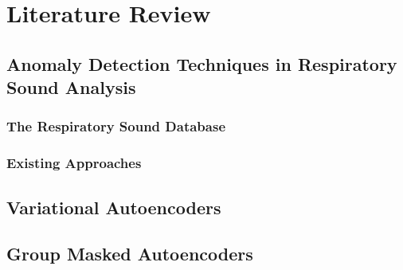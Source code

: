\cleardoubleoddpage%
\chapter{Literature Review}

\section{Anomaly Detection Techniques in Respiratory Sound Analysis}
\subsection{The Respiratory Sound Database}
\subsection{Existing Approaches}

\section{Variational Autoencoders}

\section{Group Masked Autoencoders}

